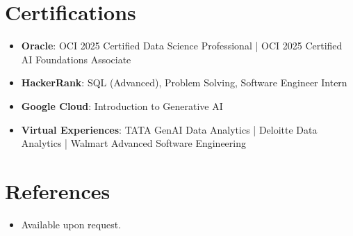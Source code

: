 \documentclass[11pt,a4paper,sans]{moderncv}
\begin{document}

\section{Certifications}
\vspace{1pt}
\begin{itemize}
\item \textbf{Oracle}: OCI 2025 Certified Data Science Professional | OCI 2025 Certified AI Foundations Associate
\item \textbf{HackerRank}: SQL (Advanced), Problem Solving, Software Engineer Intern
\item \textbf{Google Cloud}: Introduction to Generative AI
\item \textbf{Virtual Experiences}: TATA GenAI Data Analytics | Deloitte Data Analytics | Walmart Advanced Software Engineering
\end{itemize}


\section{References}
\vspace{1pt}
\begin{itemize}
\item Available upon request.
\end{itemize}
\end{document}
